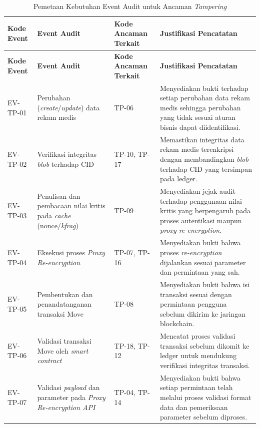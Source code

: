 \begin{xltabular}{\textwidth}{|>{\centering\arraybackslash}p{1.4cm}|X|>{\centering\arraybackslash}p{1.9cm}|X|}
\caption{Pemetaan Kebutuhan Event Audit untuk Ancaman \textit{Tampering}}
\label{tab:event-tampering}\\
\hline
\textbf{Kode Event} &
\textbf{Event Audit} &
\textbf{Kode Ancaman Terkait} &
\textbf{Justifikasi Pencatatan} \\
\hline
\endfirsthead

\hline
\textbf{Kode Event} &
\textbf{Event Audit} &
\textbf{Kode Ancaman Terkait} &
\textbf{Justifikasi Pencatatan} \\
\hline
\endhead

EV-TP-01 &
Perubahan (\textit{create}/\textit{update}) data rekam medis &
TP-06 &
Menyediakan bukti terhadap setiap perubahan data rekam medis sehingga perubahan yang tidak sesuai aturan bisnis dapat diidentifikasi.\\
\hline

EV-TP-02 &
Verifikasi integritas \textit{blob} terhadap CID &
TP-10, TP-17 &
Memastikan integritas data rekam medis terenkripsi dengan membandingkan \textit{blob} terhadap CID yang tersimpan pada ledger.\\
\hline

EV-TP-03 &
Penulisan dan pembacaan nilai kritis pada \textit{cache} (nonce/\textit{kfrag}) &
TP-09 &
Menyediakan jejak audit terhadap penggunaan nilai kritis yang berpengaruh pada proses autentikasi maupun \textit{proxy re-encryption}.\\
\hline

EV-TP-04 &
Eksekusi proses \textit{Proxy Re-encryption} &
TP-07, TP-16 &
Menyediakan bukti bahwa proses \textit{re-encryption} dijalankan sesuai parameter dan permintaan yang sah.\\
\hline

EV-TP-05 &
Pembentukan dan penandatanganan transaksi Move &
TP-08 &
Menyediakan bukti bahwa isi transaksi sesuai dengan permintaan pengguna sebelum dikirim ke jaringan blockchain.\\
\hline

EV-TP-06 &
Validasi transaksi Move oleh \textit{smart contract} &
TP-18, TP-12 &
Mencatat proses validasi transaksi sebelum dikomit ke ledger untuk mendukung verifikasi integritas transaksi.\\
\hline

EV-TP-07 &
Validasi \textit{payload} dan parameter pada \textit{Proxy Re-encryption API} &
TP-04, TP-14 &
Menyediakan bukti bahwa setiap permintaan telah melalui proses validasi format data dan pemeriksaan parameter sebelum diproses.\\
\hline


\end{xltabular}

